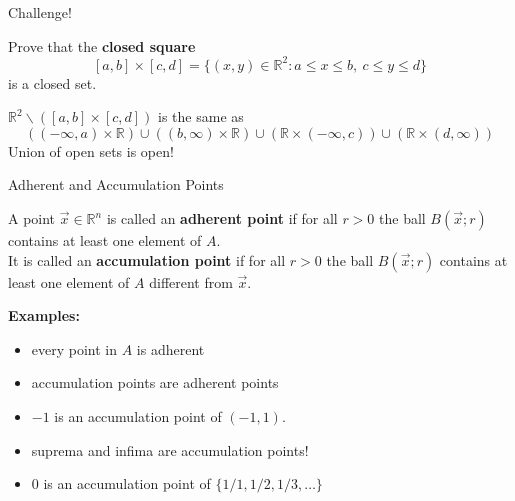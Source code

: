 \documentclass{beamer}
\begin{document}
\begin{frame}{Challenge!}
\begin{prob}
Prove that the \textbf{closed square}
$$[a,b]\times [c,d] = \{(x,y)\in\mathbb{R}^2: a \leq x \leq b,\ c\leq y\leq d\}$$
is a closed set.
\end{prob}
\pause
\begin{soln}
$\mathbb{R}^2\backslash ([a,b]\times [c,d])$ is the same as
$$((-\infty,a)\times \mathbb{R})\cup ((b,\infty)\times \mathbb{R})\cup(\mathbb{R}\times (-\infty,c))\cup (\mathbb{R}\times (d,\infty))$$
\pause
Union of open sets is open!
\end{soln}
\end{frame}


\begin{frame}{Adherent and Accumulation Points}
\begin{defn}
A point $\vec x\in \mathbb{R}^n$ is called an \textbf{adherent point} if for all $r > 0$ the ball $B(\vec x; r)$ contains at least one element of $A$.\\
\pause
It is called an \textbf{accumulation point} if for all $r > 0$ the ball $B(\vec x; r)$ contains at least one element of $A$ {\color{red} different from $\vec x$}.
\end{defn}
\pause
\textbf{Examples:}
\begin{itemize}
\pause
\item every point in $A$ is adherent
\pause
\item accumulation points are adherent points
\pause
\item $-1$ is an accumulation point of $(-1,1)$.
\pause
\item suprema and infima are accumulation points!
\pause
\item $0$ is an accumulation point of $\{1/1,1/2,1/3,\dots\}$
\end{itemize}
\end{frame}
\end{document}
